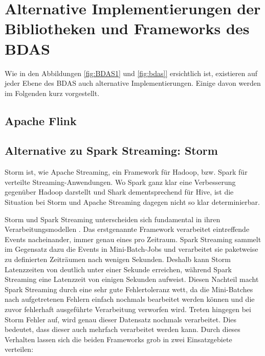 \chapter{Alternative Implementierungen der Bibliotheken und Frameworks des BDAS}
\label{chapter:alternative implementierungen}








Wie in den Abbildungen \ref{fig:BDAS1} und \ref{fig:bdas]} ersichtlich ist, existieren auf jeder Ebene des BDAS auch alternative Implementierungen. Einige davon werden im Folgenden kurz vorgestellt. 


\section{Apache Flink}
\label{section:apache flink)}





\section{Alternative zu Spark Streaming: Storm}
\label{section:storm}


Storm ist, wie Apache Streaming, ein Framework für Hadoop, bzw. Spark für verteilte Streaming-Anwendungen. Wo Spark ganz klar eine Verbesserung gegenüber Hadoop darstellt und Shark dementsprechend für Hive, ist die Situation bei Storm und Apache Streaming dagegen nicht so klar determinierbar. 

Storm und Spark Streaming unterscheiden sich fundamental in ihren Verarbeitungsmodellen . Das erstgenannte Framework verarbeitet eintreffende Events nacheinander, immer genau eines pro Zeitraum. Spark Streaming sammelt im Gegensatz dazu die Events in Mini-Batch-Jobs und verarbeitet sie paketweise zu definierten Zeiträumen nach wenigen Sekunden. Deshalb kann Storm Latenzzeiten von deutlich unter einer Sekunde erreichen, während Spark Streaming eine Latenzzeit von einigen Sekunden aufweist. Diesen Nachteil macht Spark Streaming durch eine sehr gute Fehlertoleranz wett, da die Mini-Batches nach aufgetretenen Fehlern einfach nochmals bearbeitet werden können und die zuvor fehlerhaft ausgeführte Verarbeitung verworfen wird. Treten hingegen bei Storm Fehler auf, wird genau dieser Datensatz nochmals verarbeitet. Dies bedeutet, dass dieser auch mehrfach verarbeitet werden kann. Durch dieses Verhalten lassen sich die beiden Frameworks grob in zwei Einsatzgebiete verteilen:

